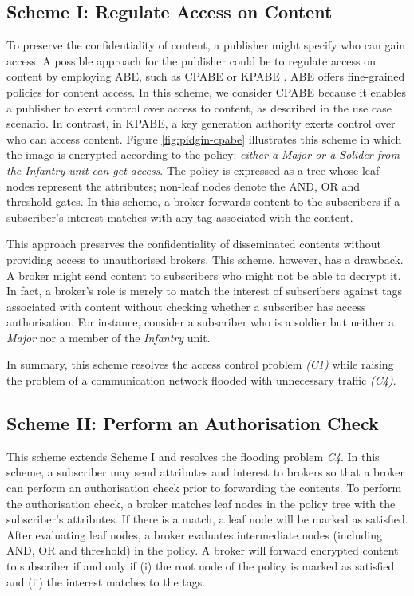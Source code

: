 \documentclass[epsfig,a4paper,11pt,titlepage]{book}
\numberwithin{algorithm}{chapter}
\begin{document}
\subsection{Scheme I: Regulate Access on Content}
To preserve the confidentiality of content, a publisher might specify who can gain access. A possible approach for the publisher could be to regulate access on content by employing \gls{ABE}, such as \gls{CPABE} \cite{Bethencourt:2007} or \gls{KPABE} \cite{Goyal:2006}. \gls{ABE} offers fine-grained policies for content access. In this scheme, we consider \gls{CPABE} because it enables a publisher to exert control over access to content, as described in the use case scenario. In contrast, in \gls{KPABE}, a key generation authority exerts control over who can access content. Figure \ref{fig:pidgin-cpabe} illustrates this scheme in which the image is encrypted according to the policy: \emph{either a Major or a Solider from the Infantry unit can get access}. The policy is expressed as a tree whose leaf nodes represent the attributes; non-leaf nodes denote the AND, OR and threshold gates. In this scheme, a broker forwards content to the subscribers if a subscriber's interest matches with any tag associated with the content.

This approach preserves the confidentiality of disseminated contents without providing access to unauthorised brokers. This scheme, however, has a drawback. A broker might send content to subscribers who might not be able to decrypt it. In fact, a broker's role is merely to match the interest of subscribers against tags associated with content without checking whether a subscriber has access authorisation. For instance, consider a subscriber who is a soldier but neither a \emph{Major} nor a member of the \emph{Infantry} unit.

In summary, this scheme resolves the access control problem \textit{(C1)} while raising the problem of a communication network flooded with unnecessary traffic \textit{(C4)}.

\subsection{Scheme II: Perform an Authorisation Check}
This scheme extends Scheme I and resolves the flooding problem \textit{C4}. In this scheme, a subscriber may send attributes and interest to brokers so that a broker can perform an authorisation check prior to forwarding the contents. To perform the authorisation check, a broker matches leaf nodes in the policy tree with the subscriber's attributes. If there is a match, a leaf node will be marked as satisfied. After evaluating leaf nodes, a broker evaluates intermediate nodes (including AND, OR and threshold) in the policy. A broker will forward encrypted content to subscriber if and only if (i) the root node of the policy is marked as satisfied and (ii) the interest matches to the tags.
\end{document}
